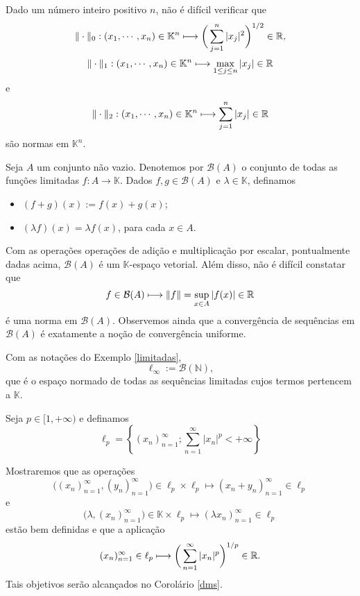\begin{example}\label{ex21}
    Dado um número inteiro positivo $n$, não é difícil verificar que
    \[
    \displaystyle \|\cdot \|_0 : (x_1,\cdots , x_n) \in \mathbb K^n \longmapsto \bigg( \sum_{j=1}^{n} |x_j|^2\bigg)^{1/2} \in \mathbb{R} ,
    \]
    \[
    \displaystyle \|\cdot \|_1 : (x_1,\cdots , x_n) \in \mathbb K^n \longmapsto \max_{1\leq j \leq n} |x_j| \in \mathbb{R} 
    \]
    e
    \[
    \displaystyle \|\cdot \|_2 : (x_1,\cdots , x_n) \in \mathbb K^n \longmapsto \sum_{j=1}^{n} |x_j| \in \mathbb{R} 
    \]
    são normas em $\mathbb K ^n$.
\end{example}

\begin{example}\label{limitadas}
Seja $A$ um conjunto não vazio. Denotemos por $\mathcal B (A)$ o conjunto de todas as funções limitadas $f: A\longrightarrow \mathbb K$. Dados $f,g \in \mathcal B (A)$ e $\lambda \in \mathbb K$, definamos
\begin{itemize}
\item $(f+g)(x):=f(x)+g(x)$; 
\item $(\lambda f)(x) = \lambda f(x)$,
para cada $x\in A$.
\end{itemize}
Com as operações operações de adição e multiplicação por escalar, pontualmente dadas acima, $\mathcal B (A)$ é um $\mathbb K$-espaço vetorial. Além disso, não é difícil constatar que
\[
\displaystyle f\in \mathcal B (A) \longmapsto \| f\| = \sup_{x\in A} |f(x)| \in \mathbb{R}
\]
é uma norma em $\mathcal B (A)$. Observemos ainda que a convergência de sequências em $\mathcal B (A)$ é exatamente a noção de convergência uniforme. 
\end{example}

\begin{definition}
    Com as notações do Exemplo \ref{limitadas},
    \[
    \ell_{\infty} := \mathcal B (\mathbb N),
    \]
    que é o espaço normado de todas as sequências limitadas cujos termos pertencem a $\mathbb K$.
\end{definition}

\begin{example}\label{lp}
    Seja $p\in [1,+\infty )$ e definamos 
    \[
    \displaystyle \ell_p =\left\{ (x_n )_{n=1}^{\infty}; \sum_{n=1}^{\infty} |x_n|^p <+\infty \right\}
    \]
    
    Mostraremos que as operações 
    \[
    \bigg( (x_n )_{n=1}^{\infty},(y_n )_{n=1}^{\infty} \bigg) \in \ell_p \times \ell_p \longmapsto (x_n +y_n )_{n=1}^{\infty} \in \ell_p
    \]
    e
    \[
    \bigg( \lambda ,(x_n )_{n=1}^{\infty} \bigg) \in \mathbb K \times \ell_p \longmapsto (\lambda x_n )_{n=1}^{\infty} \in \ell_p
    \]
    estão bem definidas e que a aplicação 
    \[
    \displaystyle (x_n )_{n=1}^{\infty} \in \ell_p \longmapsto \bigg( \sum_{n=1}^{\infty} |x_n|^p \bigg)^{1/p} \in \mathbb{R} .
    \]
    Tais objetivos serão alcançados no Corolário \ref{dms}.
\end{example}

